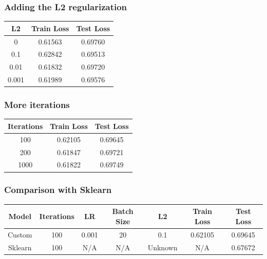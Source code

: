 \documentclass[
	letterpaper, %
	10pt, %
]{class}
\begin{document}
\subsubsection{Adding the L2 regularization}

\begin{center}
    \begin{tabular}{ |c|c|c| }
        \hline
        L2    & Train Loss & Test Loss \\
        \hline
        0     & 0.61563    & 0.69760   \\
        0.1   & 0.62842    & 0.69513   \\
        0.01  & 0.61832    & 0.69720   \\
        0.001 & 0.61989    & 0.69576   \\
        \hline
    \end{tabular}
\end{center}

\subsubsection{More iterations}

\begin{center}
    \begin{tabular}{ |c|c|c| }
        \hline
        Iterations & Train Loss & Test Loss \\
        \hline
        100        & 0.62105    & 0.69645   \\
        200        & 0.61847    & 0.69721   \\
        1000       & 0.61822    & 0.69749   \\
        \hline
    \end{tabular}
\end{center}

\subsubsection{Comparison with Sklearn}

\begin{center}
    \begin{tabular}{ |c|c|c|c|c|c|c| }
        \hline
        Model   & Iterations & LR    & Batch Size & L2      & Train Loss & Test Loss \\
        \hline
        Custom  & 100        & 0.001 & 20         & 0.1     & 0.62105    & 0.69645   \\
        Sklearn & 100        & N/A   & N/A        & Unknown & N/A        & 0.67672   \\
        \hline
    \end{tabular}
\end{center}
\end{document}
